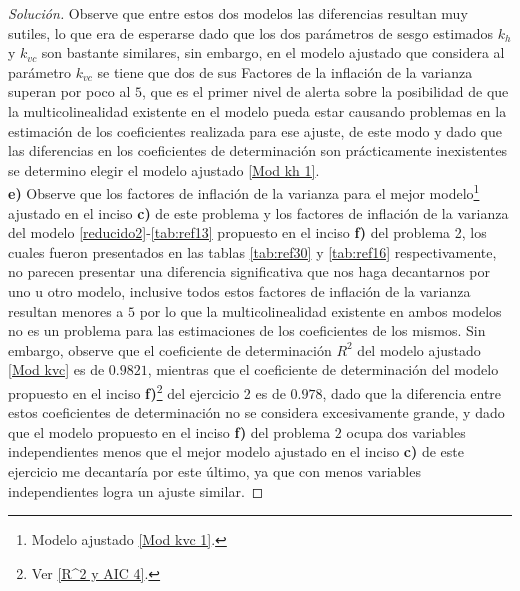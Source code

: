 \documentclass[10.5pt,notitlepage]{article}
\newenvironment{solucion}
  {\begin{proof}[Solución]}
  {\end{proof}}
\theoremstyle{plain}
\begin{document}
\begin{solucion}
Observe que entre estos dos modelos las diferencias resultan muy sutiles, lo que era de esperarse dado que los dos parámetros de sesgo estimados \(k_h\) y \(k_{vc}\) son bastante similares, sin embargo, en el modelo ajustado que considera al parámetro \(k_{vc}\) se tiene que dos de sus Factores de la inflación de la varianza superan por poco al \(5\), que es el primer nivel de alerta sobre la posibilidad de que la multicolinealidad existente en el modelo pueda estar causando problemas en la estimación de los coeficientes realizada para ese ajuste, de este modo y dado que las diferencias en los coeficientes de determinación son prácticamente inexistentes se determino elegir el modelo ajustado \eqref{Mod kh 1}.  \\ 

\noindent \textbf{e)} Observe que los factores de inflación de la varianza para el mejor modelo\footnote{Modelo ajustado \eqref{Mod kvc 1}.} ajustado en el inciso \textbf{c)} de este problema y los factores de inflación de la varianza del modelo \eqref{reducido2}-\eqref{tab:ref13} propuesto en el inciso \textbf{f)} del problema 2, los cuales fueron presentados en las tablas \ref{tab:ref30} y \ref{tab:ref16} respectivamente, no parecen presentar una diferencia significativa que nos haga decantarnos por uno u otro modelo, inclusive todos estos factores de inflación de la varianza resultan menores a \(5\) por lo que la multicolinealidad existente en ambos modelos no es un problema para las estimaciones de los coeficientes de los mismos. Sin embargo, observe que el coeficiente de determinación \(R^2\) del modelo ajustado \eqref{Mod kvc} es de \(0.9821\), mientras que el coeficiente de determinación del modelo propuesto en el inciso \textbf{f)}\footnote{Ver \eqref{R^2 y AIC 4}.} del ejercicio 2 es de \(0.978\), dado que la diferencia entre estos coeficientes de determinación no se considera excesivamente grande, y dado que el modelo propuesto en el inciso \textbf{f)} del problema \(2\) ocupa dos variables independientes menos que el mejor modelo ajustado en el inciso \textbf{c)} de este ejercicio me decantaría por este último, ya que con menos variables independientes logra un ajuste similar.
\end{solucion}
\end{document}
